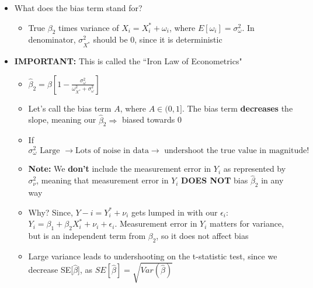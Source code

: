 \documentclass[10pt, oneside]{article}
\begin{document}
\begin{itemize}
\begin{itemize}
\begin{itemize}
            \item What does the bias term stand for?
            \begin{itemize}
                \item True $\beta_2$ times variance of $X_i = X_i^* + \omega_i$, where $E[\omega_i] = \sigma^2_\omega$. In denominator, $\sigma^2_{X^*}$ should be $0$, since it is deterministic
            \end{itemize}
            \item \textbf{IMPORTANT:} This is called the ``Iron Law of Econometrics"
                \begin{itemize}
                    \item $\hat \beta_2 = \beta[1- \frac{\sigma^2 _\omega}{\omega^2_{X^*} + \sigma^2 _\omega}]$
                    \item Let's call the bias term $A$, where $A\in (0,1]$. The bias term \textbf{decreases} the slope, meaning our $\hat \beta_2 \Rightarrow$ biased towards 0 
                    \item If $\sigma^2_\omega \text{ Large } \rightarrow \text{Lots of noise in data} \rightarrow \text{ undershoot the true value in magnitude!}$
                    \item \textbf{Note:} We \textbf{don't} include the measurement error in $Y_i$ as represented by $\sigma^2_\nu$, meaning that measurement error in $Y_i$ \textbf{DOES NOT} bias $\hat \beta_2$ in any way
                    \item Why? Since, $Y-i = Y^*_i +\nu_i$ gets lumped in with our $\epsilon_i$: $Y_i = \beta_1 + \beta_2 X_i^* + \nu_i + \epsilon_i$. Measurement error in $Y_i$ matters for variance, but is an independent term from $\beta_2$, so it does not affect bias
                    \item Large variance leads to undershooting on the t-statistic test, since we decrease SE[$\hat \beta$], as $SE[\hat \beta] = \sqrt{Var(\hat \beta)}$
                \end{itemize}
        \end{itemize}
    \end{itemize}
\end{itemize}
\end{document}
